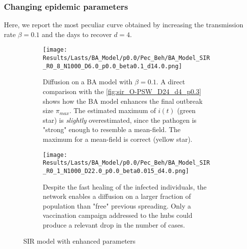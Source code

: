 \documentclass[a4paper,10pt, oneside]{book} %
\theoremstyle{definition}
\begin{document}
\clearpage
\restoregeometry
\subsubsection{Changing epidemic parameters}
Here, we report the most peculiar curve obtained by increasing the transmission rate $ \beta = 0.1$ and the days to recover $ d = 4$. 
\begin{figure}[H]
	\begin{subfigure}{\linewidth}
		\centering
		\texttt{[image: Results/Lasts/BA\_Model/p0.0/Pec\_Beh/BA\_Model\_SIR\_R0\_8\_N1000\_D6.0\_p0.0\_beta0.1\_d14.0.png]}
		\caption{Diffusion on a BA model with $\beta = 0.1$. A direct comparison with the \autoref{fig:sir_O-PSW_D24_d4_p0.3} shows how the BA model enhances the final outbreak size $\pi_{max}$.
		The estimated maximum of $ i(t)$ (green star) is \textit{slightly} overestimated, since the pathogen is "strong" enough to resemble a mean-field. The maximum for a mean-field is correct (yellow star).}
		\label{fig:sir_BA_D6_b0.1}
	\end{subfigure}
	\par\bigskip
	\begin{subfigure}{\linewidth}
		\centering
		\texttt{[image: Results/Lasts/BA\_Model/p0.0/Pec\_Beh/BA\_Model\_SIR\_R0\_1\_N1000\_D22.0\_p0.0\_beta0.015\_d4.0.png]}
		\caption{Despite the fast healing of the infected individuals, the network enables a diffusion on a larger fraction of population than "free" previous spreading. Only a vaccination campaign addressed to the hubs could produce a relevant drop in the number of cases.}
		\label{fig:sir_BA_d4D22}
	\end{subfigure}
	\caption{SIR model with enhanced parameters}
\end{figure}

\clearpage
\end{document}
